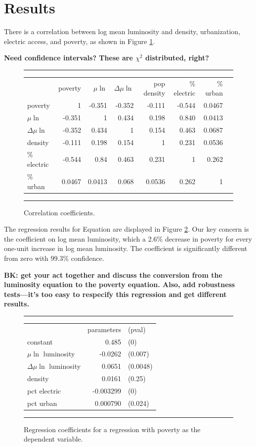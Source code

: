 \documentclass{article}
\begin{document}
\section{Results}
There is a correlation between log mean luminosity and density, urbanization, electric access, and
poverty, as shown in Figure \ref{corr}. 

{\bf Need confidence intervals? These are $\chi^2$ distributed, right?}

\begin{figure}
\begin{center}
\hrule
\begin{tabular}{lrrrrrrr}
& poverty        &   $\mu\ln$  &    $\Delta\mu\ln$ &  pop density &   \% electric & \% urban \\
poverty        &   1 & -0.351&  -0.352&        -0.111&    -0.544& 0.0467\\
$\mu\ln$       & -0.351&     1  &   0.434&       0.198&    0.840& 0.0413\\
$\Delta\mu\ln$ & -0.352&  0.434&    1 &         0.154&    0.463&0.0687\\
density    & -0.111&  0.198&   0.154&           1 &    0.231& 0.0536\\
\% electric     & -0.544&   0.84&  0.463 &        0.231&      1    &  0.262\\
\% urban       & 0.0467& 0.0413&  0.068&       0.0536&     0.262&     1
\end{tabular}
\hrule
\end{center}
\caption{Correlation coefficients.}\label{corr}
\end{figure}

The regression results for Equation \label{povertyregression} are displayed in Figure
\ref{regfig}. 
Our key concern is the coefficient on log mean luminosity, which a 2.6\%
decrease in poverty for every one-unit increase in log mean luminosity. The coefficient is
significantly different from zero with 99.3\% confidence.

{\bf BK: get your act together and discuss the conversion from the luminosity equation
to the poverty equation. Also, add robustness tests---it's too easy to respecify this
regression and get different results.}

\begin{figure}
\begin{center}
\hrule
\begin{tabular}{lrl}
                          & parameters&(pval)\\
constant                  & 0.485&(0)       \\
$\mu\ln$ luminosity       &-0.0262&(0.007)        \\
$\Delta\mu\ln$ luminosity & 0.0651&(0.0048)        \\
density                   & 0.0161&(0.25)        \\
pct electric              &-0.003299&(0)        \\
pct urban                 & 0.000790&(0.024)        
\end{tabular}
\hrule
\end{center}
\caption{Regression coefficients for a regression with poverty as the dependent variable.}\label{regfig}
\end{figure}
\end{document}
